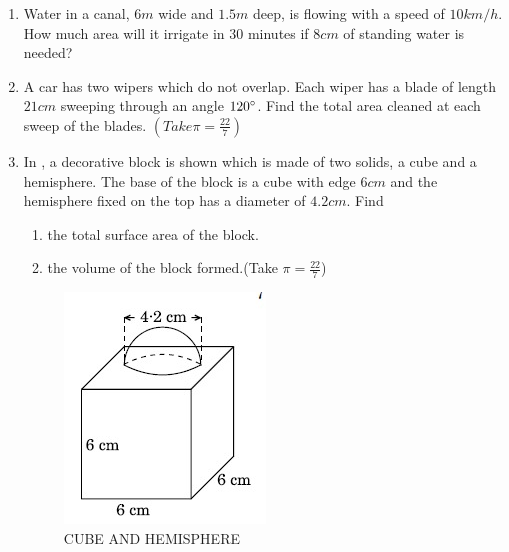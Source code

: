 \begin{enumerate}
\item Water in a canal, $6 m$ wide and $1.5 m$ deep, is flowing with a speed of $10 km/h $. How much area will it irrigate in $30$ minutes if $8 cm$ of standing water is needed?

\item A car has two wipers which do not overlap. Each wiper has a blade of length $21 cm$ sweeping through an angle $120\degree$. Find the total area cleaned at each sweep of the blades. $(Take  \pi=\frac{22}{7})$

\item In , a decorative block is shown which is made of two solids, a cube and a hemisphere. The base of the block is a cube with edge $6 cm $ and the hemisphere fixed on the top has a diameter of $4.2 cm $. Find
 \begin{enumerate}
 \item  the total surface area of the block.
 \item the volume of the block formed.(Take  $\pi=\frac{22}{7}$)
 \end{enumerate}
\begin{figure}[H]
    \centering
    \includegraphics[width=\columnwidth]{figs/image.png}
    \caption{CUBE AND HEMISPHERE}
    \label{fig:Fig-3}
\end{figure}


\end{enumerate}
